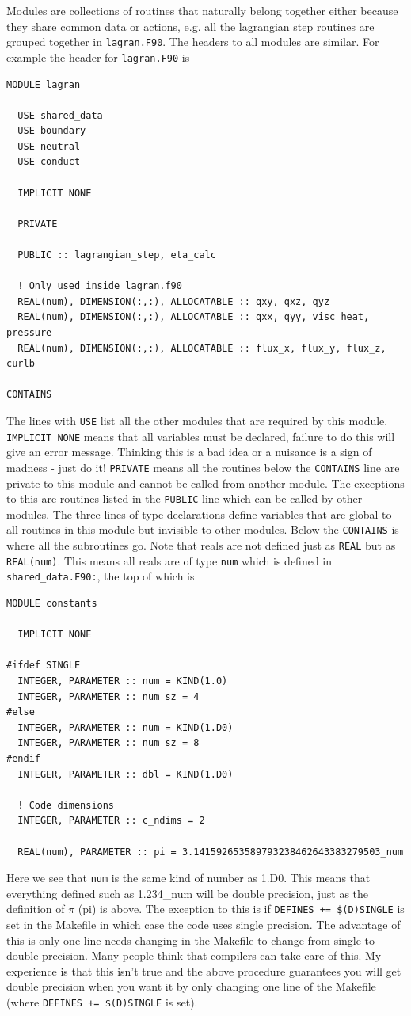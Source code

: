 \documentclass[11pt]{article}
\begin{document}
Modules are collections of routines that naturally belong together either because they share common data or actions, e.g. all the lagrangian step routines are grouped together in \texttt{lagran.F90}. The headers to all modules are similar. For example the header for \texttt{lagran.F90} is

\begin{verbatim}
MODULE lagran

  USE shared_data
  USE boundary
  USE neutral
  USE conduct

  IMPLICIT NONE

  PRIVATE

  PUBLIC :: lagrangian_step, eta_calc

  ! Only used inside lagran.f90
  REAL(num), DIMENSION(:,:), ALLOCATABLE :: qxy, qxz, qyz
  REAL(num), DIMENSION(:,:), ALLOCATABLE :: qxx, qyy, visc_heat, pressure
  REAL(num), DIMENSION(:,:), ALLOCATABLE :: flux_x, flux_y, flux_z, curlb

CONTAINS
\end{verbatim}
The lines with \texttt{USE} list all the other modules that are required by this module. \texttt{IMPLICIT NONE} means that all variables must be declared, failure to do this will give an error message. Thinking this is a bad idea or a nuisance is a sign of madness - just do it! \texttt{PRIVATE} means all the routines below the \texttt{CONTAINS} line are private to this module and cannot be called from another module. The exceptions to this are routines listed in the \texttt{PUBLIC} line which can be called by other modules. The three lines of type declarations define variables that are global to all routines in this module but invisible to other modules. Below the \texttt{CONTAINS} is where all the subroutines go. Note that reals are not defined just as \texttt{REAL} but as \texttt{REAL(num)}. This means all reals are of type \texttt{num} which is defined in {\texttt{shared\_data.F90:}}, the top of which is
\begin{verbatim}
MODULE constants

  IMPLICIT NONE

#ifdef SINGLE
  INTEGER, PARAMETER :: num = KIND(1.0)
  INTEGER, PARAMETER :: num_sz = 4
#else
  INTEGER, PARAMETER :: num = KIND(1.D0)
  INTEGER, PARAMETER :: num_sz = 8
#endif
  INTEGER, PARAMETER :: dbl = KIND(1.D0)

  ! Code dimensions
  INTEGER, PARAMETER :: c_ndims = 2

  REAL(num), PARAMETER :: pi = 3.141592653589793238462643383279503_num
\end{verbatim}
Here we see that \texttt{num} is the same kind of number as 1.D0. This means that everything defined such as 1.234\_num will be double precision, just as the definition of $\pi$ (pi) is above. The exception to this is if \texttt{DEFINES += \$(D)SINGLE} is set in the Makefile in which case the code uses single precision. The advantage of this is only one line needs changing in the Makefile to change from single to double precision. Many people think that compilers can take care of this. My experience is that this isn't true and the above procedure guarantees you will get double precision when you want it by only changing one line of the Makefile (where {\tt DEFINES += \$(D)SINGLE} is set).
\end{document}

